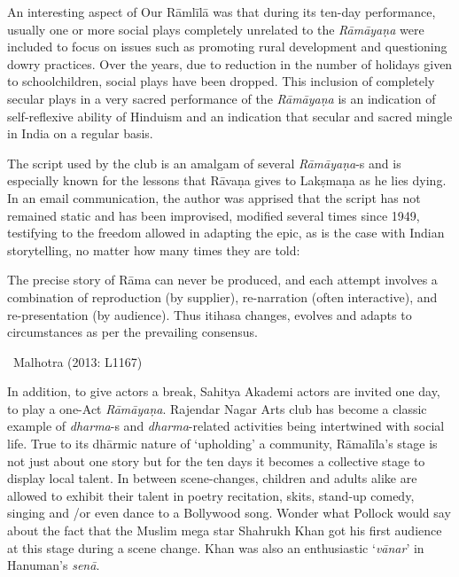 An interesting aspect of Our Rāmlīlā was that during its ten-day performance, usually one or more social plays completely unrelated to the \textit{Rāmāyaṇa} were included to focus on issues such as promoting rural development and questioning dowry practices. Over the years, due to reduction in the number of holidays given to schoolchildren, social plays have been dropped. This inclusion of completely secular plays in a very sacred performance of the \textit{Rāmāyaṇa} is an indication of self-reflexive ability of Hinduism and an indication that secular and sacred mingle in India on a regular basis.

The script used by the club is an amalgam of several \textit{Rāmāyaṇa}-s and is especially known for the lessons that Rāvaṇa gives to Lakṣmaṇa as he lies dying. In an email communication, the author was apprised that the script has not remained static and has been improvised, modified several times since 1949, testifying to the freedom allowed in adapting the epic, as is the case with Indian storytelling, no matter how many times they are told:

\begin{myquote}
The precise story of Rāma can never be produced, and each attempt involves a combination of reproduction (by supplier), re-narration (often interactive), and re-presentation (by audience). Thus itihasa changes, evolves and adapts to circumstances as per the prevailing consensus. 

~\hfill Malhotra (2013: L1167)
\end{myquote}

In addition, to give actors a break, Sahitya Akademi actors are invited one day, to play a one-Act \textit{Rāmāyaṇa}. Rajendar Nagar Arts club has become a classic example of \textit{dharma}-s and \textit{dharma}-related activities being intertwined with social life. True to its dhārmic nature of ‘upholding’ a community, Rāmalīla’s stage is not just about one story but for the ten days it becomes a collective stage to display local talent. In between scene-changes, children and adults alike are allowed to exhibit their talent in poetry recitation, skits, stand-up comedy, singing and /or even dance to a Bollywood song. Wonder what Pollock would say about the fact that the Muslim mega star Shahrukh Khan got his first audience at this stage during a scene change. Khan was also an enthusiastic ‘\textit{vānar}’ in Hanuman’s \textit{senā}.

